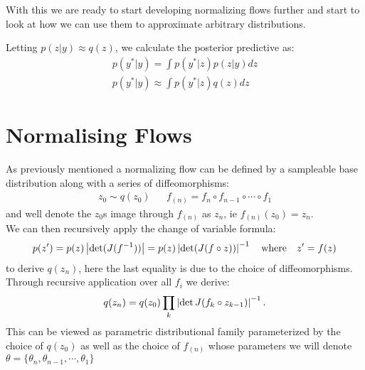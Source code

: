 With this we are ready to start developing normalizing flows further and start to look at how we can use them to approximate arbitrary distributions.

Letting $p(z|y) \approx q(z)$, we calculate the posterior predictive as:
\begin{align*}
    p(y^*|y) = \int p(y^*|z) p(z | y) dz  \\
    p(y^*|y) \approx \int p(y^*|z) q(z) dz
\end{align*}

\clearpage
\section{Normalising Flows}\label{NF}
As previously mentioned a normalizing flow can be defined by a sampleable base distribution along with a series of diffeomorphisms:
\begin{align*}
    z_0\sim q(z_0) && f_{(n)}=f_n\circ f_{n-1} \circ \cdots \circ f_1
\end{align*}
and well denote the $z_0$s image through $f_{(n)}$ as $z_n$, ie $f_{(n)}(z_0)=z_n$.\\
We can then recursively apply the change of variable formula:
\begin{align*}
    p(z')=p(z)\left\lvert\det(J(f^{-1}))\right\rvert=p(z)\left\lvert\det(J(f\circ z))\right\rvert^{-1} \quad \text{where} \quad z'=f(z)
\end{align*}
to derive $q(z_n)$, here the last equality is due to the choice of diffeomorphisms. Through recursive application over all $f_i$ we derive:
\begin{align*}
    q(z_n)=q(z_0)\prod_k\left\lvert\det J(f_k \circ z_{k-1})\right\rvert^{-1}.
\end{align*}
This can be viewed as parametric distributional family parameterized by the choice of $q(z_0)$ as well as the choice of $f_{(n)}$ whose parameters we will denote $\theta=\{\theta_n,\theta_{n-1},\cdots,\theta_1\}$

